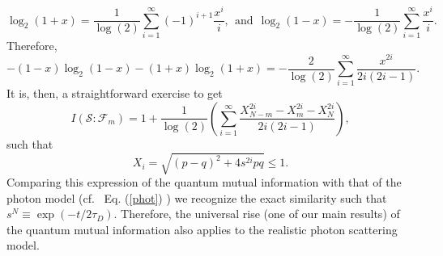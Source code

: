 \documentclass[aps,prl,showpacs,amsmath,amssymb,amsfonts,lengthcheck,onecolumn,longbibliography,superscriptaddress]{revtex4-2}
\newcommand\myeqref[1]{
	Eq. (\textup{\ref{#1}})
}
\newcommand{\+}         {\dagger}
\begin{document}
\begin{equation}
	\log_{2}(1+x)=\frac{1}{\log(2)}\sum_{i=1}^{\infty}(-1)^{i+1} \frac{x^{i}}{i}, \ \ \text{and} \ \ \log_{2}(1-x)=-\frac{1}{\log(2)}\sum_{i=1}^{\infty} \frac{x^{i}}{i}.
\end{equation}
Therefore,
\begin{equation}
	-(1-x)\log_{2}(1-x)-(1+x)\log_{2}(1+x)=-\frac{2}{\log(2)}\sum_{i=1}^{\infty} \frac{x^{2i}}{2i(2i-1)}.
\end{equation}
It is, then, a straightforward exercise to get
\begin{equation}
	I (\mathcal{S}: \mathcal{F}_m)=1+\frac{1}{\log(2)}\left(\sum_{i=1}^{\infty} \frac{X_{N-m}^{2i}-X_{m}^{2i}-X_{N}^{2i}}{2i(2i-1)}\right),
	\label{series}
\end{equation}
such that
\begin{equation}
	X_i=\sqrt{\left(p-q\right)^2+4s^{2i}pq} \leq 1.
\end{equation}
Comparing this expression of the quantum mutual information with that of the photon model (cf.~\myeqref{phot}) we recognize the exact similarity such that $s^{N} \equiv \exp(-t/2\tau_D)$. Therefore, the universal rise (one of our main results) of the quantum mutual information also applies to the realistic photon scattering model.


\end{document}
